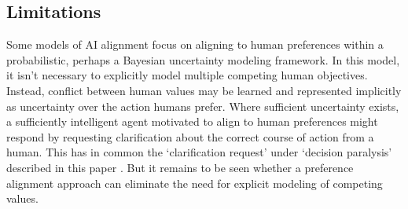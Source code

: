 \subsection{Limitations}



Some models of AI alignment focus on \cite{russell2019human} aligning to human preferences within a probabilistic, perhaps a Bayesian uncertainty modeling framework.  In this model, it isn't necessary to explicitly model multiple competing human objectives. Instead, conflict between human values may be learned and represented implicitly as uncertainty over the action humans prefer. Where sufficient uncertainty exists, a sufficiently intelligent agent motivated to align to human preferences might respond by requesting clarification about the correct course of action from a human. This has in common the `clarification request' under `decision paralysis' described in this paper%
. But it remains to be seen whether a preference alignment approach can eliminate the need for explicit modeling of competing values.

